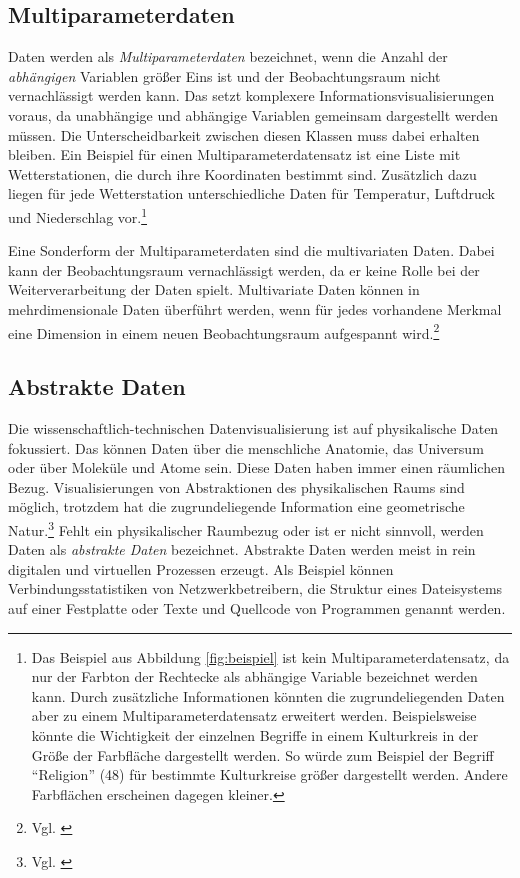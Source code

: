 \documentclass[a4paper, 12pt, DIVcalc, onepage, pdftex, headsepline, footsepline]{scrreprt}
\begin{document}
\subsection{Multiparameterdaten}
Daten werden als \textit{Multiparameterdaten} bezeichnet, wenn die Anzahl der \textit{abhängigen} Variablen größer Eins ist
und der Beobachtungsraum nicht vernachlässigt werden kann. Das setzt komplexere
Informationsvisualisierungen voraus, da unabhängige und abhängige Variablen gemeinsam
dargestellt werden müssen. Die Unterscheidbarkeit zwischen diesen Klassen muss dabei
erhalten bleiben.
Ein Beispiel für einen Multiparameterdatensatz ist eine Liste mit Wetterstationen, die durch ihre
Koordinaten bestimmt sind. Zusätzlich dazu liegen für jede Wetterstation unterschiedliche
Daten für Temperatur, Luftdruck und Niederschlag vor.\footnote{Das Beispiel aus Abbildung
\ref{fig:beispiel} ist kein Multiparameterdatensatz, da nur der Farbton der Rechtecke als
abhängige Variable bezeichnet werden kann. Durch zusätzliche Informationen könnten die
zugrundeliegenden Daten aber zu einem Multiparameterdatensatz erweitert werden. Beispielsweise
könnte die Wichtigkeit der einzelnen Begriffe in einem Kulturkreis in der Größe der
Farbfläche dargestellt werden. So würde zum Beispiel der Begriff "`Religion"' (48) für
bestimmte Kulturkreise größer dargestellt werden. Andere Farbflächen erscheinen dagegen
kleiner.}

Eine Sonderform der Multiparameterdaten sind die multivariaten Daten. Dabei kann
der Beobachtungsraum vernachlässigt werden, da er keine Rolle bei der Weiterverarbeitung
der Daten spielt. Multivariate Daten können in mehrdimensionale Daten überführt werden,
wenn für jedes vorhandene Merkmal eine Dimension in einem neuen Beobachtungsraum
aufgespannt wird.\footnote{Vgl. \citep[S.\,172]{Schumann}}

\subsection{Abstrakte Daten}
Die wissenschaftlich-technischen Datenvisualisierung ist auf physikalische Daten fokussiert.
Das können Daten über die menschliche Anatomie, das Universum oder über Moleküle und Atome sein. Diese Daten
haben immer einen räumlichen Bezug. Visualisierungen von Abstraktionen des physikalischen Raums
sind möglich, trotzdem hat die zugrundeliegende Information eine geometrische Natur.\footnote{Vgl. \citep[S.\,6]{Card}}
Fehlt ein physikalischer Raumbezug oder ist er nicht sinnvoll, werden Daten als \textit{abstrakte Daten} bezeichnet.
Abstrakte Daten werden meist in rein digitalen und virtuellen Prozessen erzeugt. Als Beispiel
können Verbindungsstatistiken von Netzwerkbetreibern, die Struktur eines Dateisystems auf einer
Festplatte oder Texte und Quellcode von Programmen genannt werden.
\end{document}

